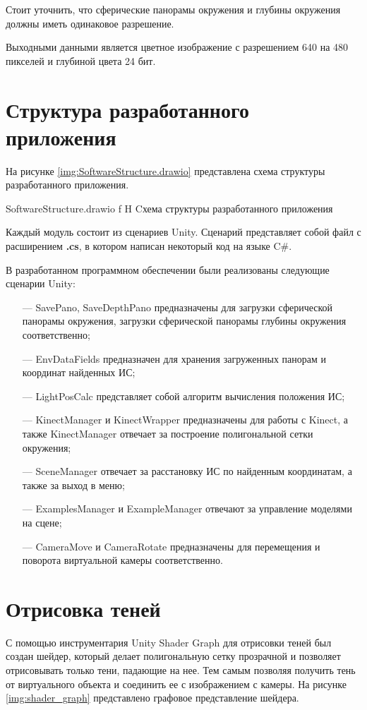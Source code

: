 Стоит уточнить, что сферические панорамы окружения и глубины окружения должны иметь одинаковое разрешение.

Выходными данными является цветное изображение с разрешением 640 на 480 пикселей и глубиной цвета 24 бит.

\section{Структура разработанного приложения}

На рисунке \ref{img:SoftwareStructure.drawio} представлена схема структуры разработанного приложения.

{SoftwareStructure.drawio}
{f}
{H}
{\textwidth}
{Cхема структуры разработанного приложения}

Каждый модуль состоит из сценариев Unity. Сценарий представляет собой файл с расширением \textbf{.cs}, в котором написан некоторый код на языке C\#.

В разработанном программном обеспечении были реализованы следующие сценарии Unity:

\begin{itemize}
	\item[---] SavePano, SaveDepthPano предназначены для загрузки сферической панорамы окружения, загрузки сферической панорамы глубины окружения соответственно;
	\item[---] EnvDataFields предназначен для хранения загруженных панорам и координат найденных ИС;
	\item[---] LightPosCalc представляет собой алгоритм вычисления положения ИС;
	\item[---] KinectManager и KinectWrapper предназначены для работы с Kinect, а также KinectManager отвечает за построение полигональной сетки окружения;
	\item[---] SceneManager отвечает за расстановку ИС по найденным координатам, а также за выход в меню;
	\item[---] ExamplesManager и ExampleManager отвечают за управление моделями на сцене;
	\item[---] CameraMove и CameraRotate предназначены для перемещения и поворота виртуальной камеры соответственно.
\end{itemize}

\section{Отрисовка теней}

С помощью инструментария Unity Shader Graph \cite{shader_graph} для отрисовки теней был создан шейдер, который делает полигональную сетку прозрачной и позволяет отрисовывать только тени, падающие на нее. Тем самым позволяя получить тень от виртуального объекта и соединить ее с изображением с камеры. На рисунке \ref{img:shader_graph} представлено графовое представление шейдера.

